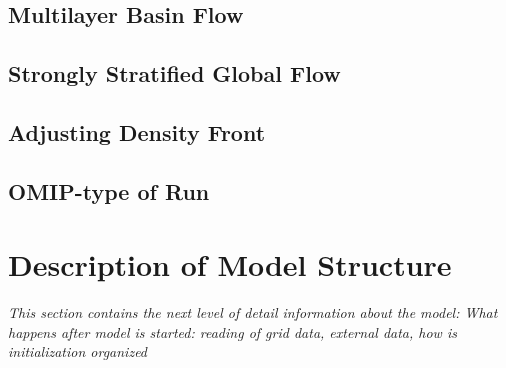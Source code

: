 \documentclass[a4paper,10pt]{article}
\begin{document}
\subsection{Multilayer Basin Flow}

\subsection{Strongly Stratified Global Flow}

\subsection{Adjusting Density Front}

\subsection{OMIP-type of Run}



\section{Description of Model Structure}
{\it This section contains the next level of detail information about the model:
What happens after model is started: reading of grid data, external data, how
is initialization organized} 
\end{document}
